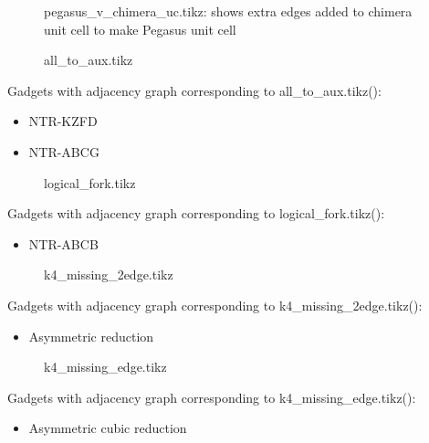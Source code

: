 \documentclass{article}
\begin{document}
\begin{figure}

\caption{pegasus\_v\_chimera\_uc.tikz: shows extra edges added to chimera unit cell to make Pegasus unit cell}
\end{figure}


\begin{figure}

\caption{all\_to\_aux.tikz}
\end{figure}

Gadgets with adjacency graph corresponding to all\_to\_aux.tikz(\scalebox{.25}{}):

\begin{itemize}
\item NTR-KZFD
\item NTR-ABCG
\end{itemize}

\begin{figure}

\caption{logical\_fork.tikz}
\end{figure}

Gadgets with adjacency graph corresponding to logical\_fork.tikz(\scalebox{.25}{}):

\begin{itemize}
\item NTR-ABCB
\end{itemize}

\begin{figure}

\caption{k4\_missing\_2edge.tikz}
\end{figure}

Gadgets with adjacency graph corresponding to k4\_missing\_2edge.tikz(\scalebox{.25}{}):

\begin{itemize}
\item Asymmetric reduction
\end{itemize}

\begin{figure}

\caption{k4\_missing\_edge.tikz}
\end{figure}

Gadgets with adjacency graph corresponding to k4\_missing\_edge.tikz(\scalebox{.25}{}):

\begin{itemize}
\item Asymmetric cubic reduction
\end{itemize}
\end{document}
